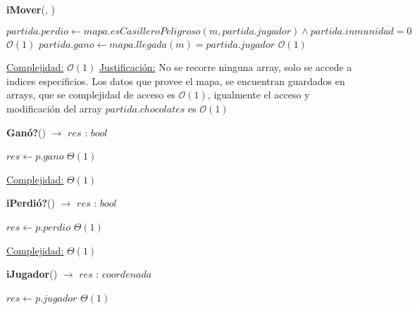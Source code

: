 \documentclass[10pt, a4paper]{article}
\newcommand{\bigO}{\mathcal{O}}
\begin{document}
\begin{Algoritmos}
\begin{algorithm}[H]{\textbf{iMover}(, )}
\begin{algorithmic}[1]
                        \State $partida.perdio \gets mapa.esCasilleroPeligroso(m, partida.jugador) \wedge partida.inmunidad = 0$    \Comment $\bigO(1)$
                        \State $partida.gano \gets mapa.llegada(m) = partida.jugador$                                               \Comment $\bigO(1)$

                    \EndIf

                    \medskip
                    \Statex \underline{Complejidad:} $\bigO(1)$
                    \Statex \underline{Justificación:} No se recorre ninguna array, solo se accede a indices especificios. Los datos que provee el mapa, se encuentran guardados en arrays, que se complejidad de acceso es $\bigO(1)$, igualmente el acceso y modificación del array $partida.chocolates$ es $\bigO(1)$
                \end{algorithmic}
        \end{algorithm}
            

        \begin{algorithm}[H]{\textbf{Ganó?}() $\to$ $res$ : $bool$}
            \begin{algorithmic}[1]
                    \State $res \gets p.gano$                                                                   \Comment $\Theta(1)$

                    \medskip
                    \Statex \underline{Complejidad:} $\Theta(1)$
                \end{algorithmic}
        \end{algorithm}

        \begin{algorithm}[H]{\textbf{iPerdió?}() $\to$ $res$ : $bool$}
            \begin{algorithmic}[1]
                    \State $res \gets p.perdio$                                                                 \Comment $\Theta(1)$

                    \medskip
                    \Statex \underline{Complejidad:} $\Theta(1)$
                \end{algorithmic}
        \end{algorithm}

        \begin{algorithm}[H]{\textbf{iJugador}() $\to$ $res$ : $coordenada$}
            \begin{algorithmic}[1]
                    \State $res \gets p.jugador$                                                               \Comment $\Theta(1)$


\end{algorithmic}
\end{algorithm}
\end{Algoritmos}
\end{document}
